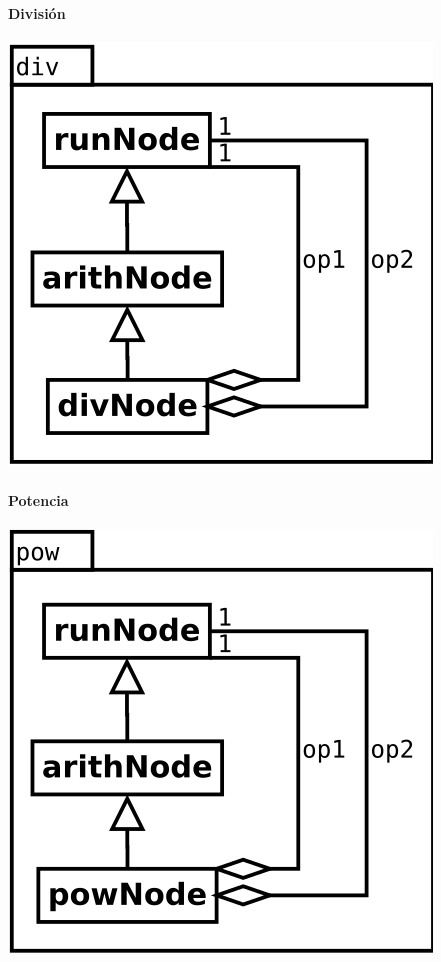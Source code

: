 \paragraph {División}
\begin{center}
\includegraphics[scale=0.4]{div.png} \\
\end{center}

\paragraph {Potencia}
\begin{center}
\includegraphics[scale=0.4]{pow.png} \\
\end{center}

